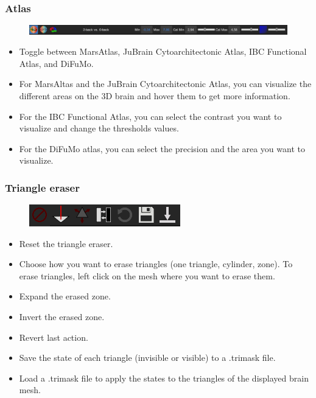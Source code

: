 \documentclass[a4paper]{article}
\begin{document}
\subsubsection{Atlas}
\begin{figure}[H]
\begin{center}
\includegraphics[scale=0.5]{Atlas.png}
\end{center}
\end{figure}
\begin{itemize}
\item Toggle between MarsAtlas, JuBrain Cytoarchitectonic Atlas, IBC Functional Atlas, and DiFuMo.
\item For MarsAltas and the JuBrain Cytoarchitectonic Atlas, you can visualize the different areas on the 3D brain and hover them to get more information.
\item For the IBC Functional Atlas, you can select the contrast you want to visualize and change the thresholds values.
\item For the DiFuMo atlas, you can select the precision and the area you want to visualize.
\end{itemize}
\subsubsection{Triangle eraser}
\begin{figure}[H]
\begin{center}
\includegraphics[scale=0.5]{TriEraser.png}
\end{center}
\end{figure}
\begin{itemize}
\item Reset the triangle eraser.
\item Choose how you want to erase triangles (one triangle, cylinder, zone). To erase triangles, left click on the mesh where you want to erase them.
\item Expand the erased zone.
\item Invert the erased zone.
\item Revert last action.
\item Save the state of each triangle (invisible or visible) to a .trimask file.
\item Load a .trimask file to apply the states to the triangles of the displayed brain mesh.
\end{itemize}
\end{document}

